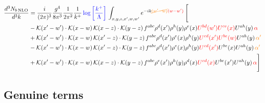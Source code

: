 \documentclass[9pt]{article}
\numberwithin{equation}{section}
\begin{document}
\begin{align}
      \frac{d^{3}N_{b\,\rm NLO}}{d^{3}k} & = \frac{i}{(2\pi)^{3}}\frac{g^{4}}{8\pi^{3}}\frac{1}{2\pi^{2}} \frac{1}{k^{+}}\,{\color{blue}\log{\left[\frac{k^{+}}{\Lambda}\right]}}\,\int_{x,y,z,x^{\prime},w,w^{\prime}}e^{-ik{\color{orange}\cancel{(w^{\prime}-w)}}{\color{red}(w-w^{\prime})}}\, \Bigg[\notag \\ & - \mathcal{K}(x'-w')\cdot \mathcal{K}(x-w)\, \mathcal{K}(x-z)\cdot \mathcal{K}(y-z)\, f^{a b c} \rho^{d}(x') \rho^{h}(y) \rho^{e}(x) {\color{red}U^{bd}(w')} {\color{red}U^{ce}(x)} U^{a h}(y)\, {\color{red} \alpha}\nonumber\\
    &+ \mathcal{K}(x'-w')\cdot \mathcal{K}(x-w)\,\mathcal{K}(x'-z)\cdot \mathcal{K}(y-z)\, f^{a b c} \rho^{d}(x') \rho^{e}(x) \rho^{h}(y) {\color{red}U^{cd}(x')} {\color{red}U^{be}(w)} U^{a h}(y)\, {\color{orange} \alpha'}\nonumber\\
    &- \mathcal{K}(x'-w')\cdot \mathcal{K}(x-w)\,\mathcal{K}(x'-z)\cdot \mathcal{K}(y-z)\, f^{a b c} \rho^{d}(x') \rho^{e}(x) \rho^{h}(y) {\color{red}U^{cd}(x')} U^{b e}(x) U^{a h}(y)\, {\color{orange} \alpha'}\nonumber\\
    &+  \mathcal{K}(x'-w')\cdot \mathcal{K}(x-w)\, \mathcal{K}(x-z)\cdot \mathcal{K}(y-z)\, f^{a b c} \rho^{e}(x') \rho^{h}(y) \rho^{d}(x) {\color{red}U^{cd}(x)} U^{b e}(x') U^{a h}(y)\, {\color{red} \alpha} \Bigg]
\end{align}
\subsection{Genuine terms}
\end{document}

